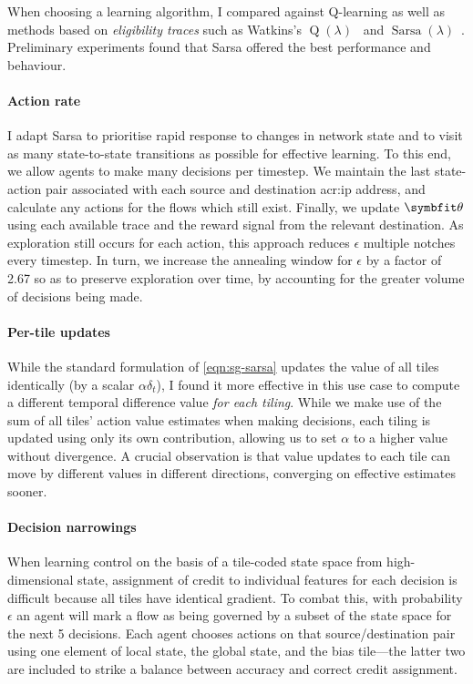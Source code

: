 When choosing a learning algorithm, I compared against Q-learning as well as methods based on \emph{eligibility traces} such as Watkins's $\operatorname{Q}(\lambda)$~\parencite[pp. 312--314]{RL2E} and $\operatorname{Sarsa}(\lambda)$~\parencite[p. 305]{RL2E}.
Preliminary experiments found that Sarsa offered the best performance and behaviour.

\paragraph{Action rate}
I adapt Sarsa to prioritise rapid response to changes in network state and to visit as many state-to-state transitions as possible for effective learning.
To this end, we allow agents to make many decisions per timestep.
We maintain the last state-action pair associated with each source and destination \gls{acr:ip} address, and calculate any actions for the flows which still exist.
Finally, we update $\wvec{}$ using each available trace and the reward signal from the relevant destination.
As exploration still occurs for each action, this approach reduces $\epsilon$ multiple notches every timestep.
In turn, we increase the annealing window for $\epsilon$ by a factor of \num{2.67} so as to preserve exploration over time, by accounting for the greater volume of decisions being made.

\paragraph{Per-tile updates}
While the standard formulation of \cref{eqn:sg-sarsa} updates the value of all tiles identically (by a scalar $\alpha \delta_t$), I found it more effective in this use case to compute a different temporal difference value \emph{for each tiling}.
While we make use of the sum of all tiles' action value estimates when making decisions, each tiling is updated using only its own contribution, allowing us to set $\alpha$ to a higher value without divergence.
A crucial observation is that value updates to each tile can move by different values in different directions, converging on effective estimates sooner.

\paragraph{Decision narrowings}
When learning control on the basis of a tile-coded state space from high-dimensional state, assignment of credit to individual features for each decision is difficult because all tiles have identical gradient.
To combat this, with probability $\epsilon$ an agent will mark a flow as being governed by a subset of the state space for the next \num{5} decisions.
Each agent chooses actions on that source/destination pair using one element of local state, the global state, and the bias tile---the latter two are included to strike a balance between accuracy and correct credit assignment.

